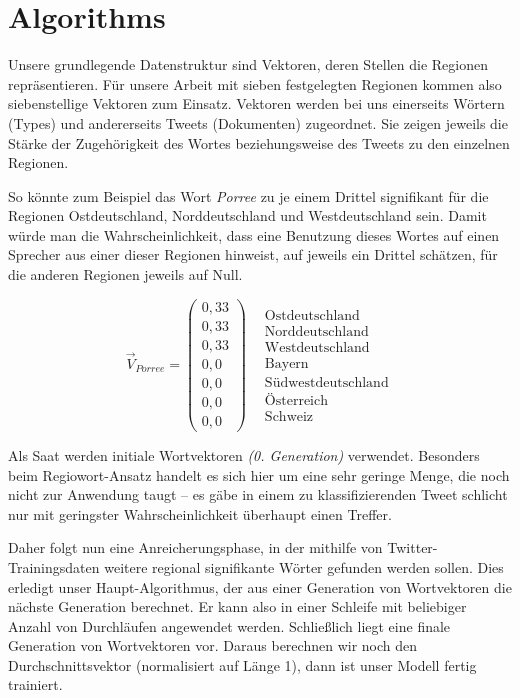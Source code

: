 \documentclass[../Main.tex]{subfiles}
\begin{document}
\section{Algorithms}
Unsere grundlegende Datenstruktur sind Vektoren, deren Stellen die Regionen repräsentieren. Für unsere Arbeit mit sieben festgelegten Regionen kommen also siebenstellige Vektoren zum Einsatz.
Vektoren werden bei uns einerseits Wörtern (Types) und andererseits Tweets (Dokumenten) zugeordnet. Sie zeigen jeweils die Stärke der Zugehörigkeit des Wortes beziehungsweise des Tweets zu den einzelnen Regionen.

So könnte zum Beispiel das Wort \textit{Porree} zu je einem Drittel signifikant für die Regionen Ostdeutschland, Norddeutschland und Westdeutschland sein. Damit würde man die Wahrscheinlichkeit, dass eine Benutzung dieses Wortes auf einen Sprecher aus einer dieser Regionen hinweist, auf jeweils ein Drittel schätzen, für die anderen Regionen jeweils auf Null.

$$\vec V_{Porree} = \begin{pmatrix} 0,33 \\ 0,33 \\ 0,33 \\ 0,0 \\ 0,0 \\ 0,0 \\ 0,0 \end{pmatrix} \ \ \ \ \begin{matrix} \text{Ostdeutschland} \\ \text{Norddeutschland} \\ \text{Westdeutschland} \\ \text{Bayern} \\ \text{Südwestdeutschland} \\ \text{Österreich} \\ \text{Schweiz} \end{matrix}$$

Als Saat werden initiale Wortvektoren \textit{(0. Generation)} verwendet. Besonders beim Regiowort-Ansatz handelt es sich hier um eine sehr geringe Menge, die noch nicht zur Anwendung taugt -- es gäbe in einem zu klassifizierenden Tweet schlicht nur mit geringster Wahrscheinlichkeit überhaupt einen Treffer.

Daher folgt nun eine Anreicherungsphase, in der mithilfe von Twitter-Trainingsdaten weitere regional signifikante Wörter gefunden werden sollen. Dies erledigt unser Haupt-Algorithmus, der aus einer Generation von Wortvektoren die nächste Generation berechnet. Er kann also in einer Schleife mit beliebiger Anzahl von Durchläufen angewendet werden. Schließlich liegt eine finale Generation von Wortvektoren vor. Daraus berechnen wir noch den Durchschnittsvektor (normalisiert auf Länge 1), dann ist unser Modell fertig trainiert.
\end{document}
